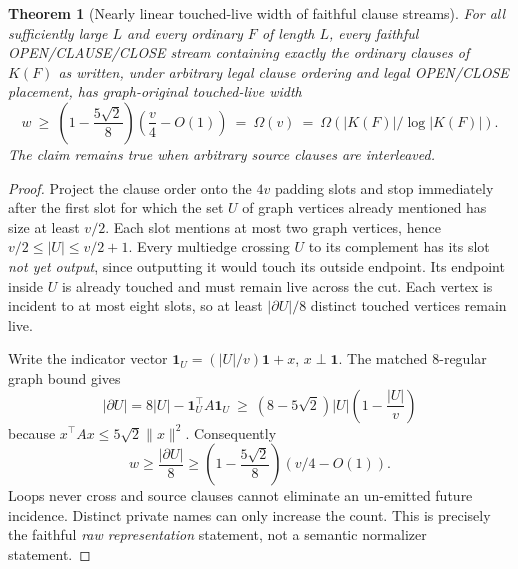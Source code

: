 \documentclass[11pt]{article}
\newtheorem{theorem}{Theorem}
\begin{document}
\begin{theorem}[Nearly linear touched-live width of faithful clause streams]\label{th:width}
For all sufficiently large $L$ and every ordinary $F$ of length $L$, \emph{every} faithful OPEN/CLAUSE/CLOSE stream containing exactly the ordinary clauses of $K(F)$ as written, under arbitrary legal clause ordering and legal OPEN/CLOSE placement, has graph-original touched-live width
\[
w\ \ge\ \left(1-\frac{5\sqrt2}{8}\right)\left(\frac v4-O(1)\right)
\ =\ \Omega(v)\ =\ \Omega(|K(F)|/\log |K(F)|).
\]
The claim remains true when arbitrary source clauses are interleaved.
\end{theorem}
\begin{proof}
Project the clause order onto the $4v$ padding slots and stop immediately after the first slot for which the set $U$ of graph vertices already mentioned has size at least $v/2$. Each slot mentions at most two graph vertices, hence $v/2\le |U|\le v/2+1$. Every multiedge crossing $U$ to its complement has its slot \emph{not yet output}, since outputting it would touch its outside endpoint. Its endpoint inside $U$ is already touched and must remain live across the cut. Each vertex is incident to at most eight slots, so at least $|\partial U|/8$ distinct touched vertices remain live.

Write the indicator vector $\mathbf1_U=(|U|/v)\mathbf1+x$, $x\perp\mathbf1$. The matched 8-regular graph bound gives
\[
|\partial U|=8|U|-\mathbf1_U^\top A\mathbf1_U
\ \ge\ (8-5\sqrt2)|U|\left(1-\frac{|U|}{v}\right)
\]
because $x^\top Ax\le5\sqrt2\|x\|^2$. Consequently
\[
w\ge \frac{|\partial U|}{8}
\ge\left(1-\frac{5\sqrt2}{8}\right)(v/4-O(1)).
\]
Loops never cross and source clauses cannot eliminate an un-emitted future incidence. Distinct private names can only increase the count. This is precisely the faithful \emph{raw representation} statement, not a semantic normalizer statement.
\end{proof}
\end{document}
